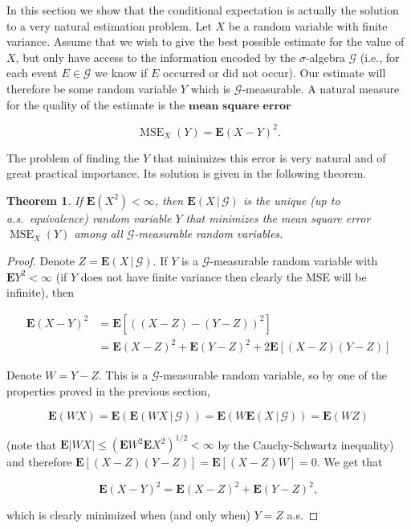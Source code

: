 \documentclass[11pt]{report}
\theoremstyle{plain}
\newtheorem{thm}{Theorem}[chapter]
\theoremstyle{definition}
\begin{document}
In this section we show that the conditional
expectation is actually the solution to a very natural
estimation problem. Let $X$ be a random variable with
finite variance. Assume that we wish to give the best
possible estimate for the value of $X$, but only have
access to the information encoded by the
$\sigma$-algebra $\mathcal{G}$ (i.e., for each event
$E\in\mathcal{G}$ we know if $E$ occurred or did not
occur). Our estimate will therefore be some random
variable $Y$ which is $\mathcal{G}$-measurable. A
natural measure for the quality of the estimate is the
$\textbf{mean square error}$

\[
\operatorname{MSE}_X(Y) = \mathbf{E}(X-Y)^2.
\]

\noindent The problem of finding the $Y$ that minimizes this
error is very natural and of great practical
importance. Its solution is given in the following
theorem.

\begin{thm}
If $\mathbf{E}(X^2)<\infty$, then
$\mathbf{E}\left(X\,|\,\mathcal{G}\right)$ is the
unique (up to a.s.\ equivalence) random variable $Y$
that minimizes the mean square error
$\operatorname{MSE}_X(Y)$ among all
$\mathcal{G}$-measurable random variables.
\end{thm}

\begin{proof}
Denote $Z=\mathbf{E}\left(X\,|\,\mathcal{G}\right)$.
If $Y$ is a $\mathcal{G}$-measurable random variable
with $\mathbf{E} Y^2<\infty$ (if $Y$ does not have
finite variance then clearly the MSE will be
infinite), then

\begin{align*}
\mathbf{E}(X-Y)^2 &= \mathbf{E}[((X-Z)-(Y-Z))^2] \\
&= \mathbf{E}(X-Z)^2 + \mathbf{E}(Y-Z)^2
+ 2 \mathbf{E}[(X-Z)(Y-Z)]
\end{align*}

\noindent Denote $W=Y-Z$. This is a $\mathcal{G}$-measurable
random variable, so by one of the properties proved in
the previous section,

\[
\mathbf{E}(WX) = \mathbf{E}(\mathbf{E}\left(WX\,|\,\mathcal{G}\right))
= \mathbf{E}(W \mathbf{E}\left(X\,|\,\mathcal{G}\right)) = \mathbf{E}(WZ)
\]

\noindent (note that
$\mathbf{E}|WX|\le (\mathbf{E} W^2 \mathbf{E}
X^2)^{1/2}<\infty$
by the Cauchy-Schwartz inequality) and therefore
$\mathbf{E}[(X-Z)(Y-Z)] = \mathbf{E}[(X-Z)W]=0$. We
get that

\[
\mathbf{E}(X-Y)^2 = \mathbf{E}(X-Z)^2 + \mathbf{E}(Y-Z)^2,
\]

\noindent which is clearly minimized when (and only when) $Y=Z$
a.s.
\end{proof}
\end{document}
